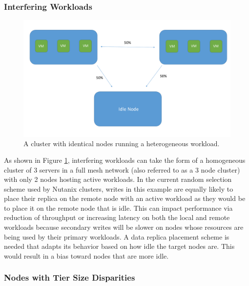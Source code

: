 \documentclass[12pt]{article}
\begin{document}
    \subsubsection{Interfering Workloads}

    \begin{figure}[htbp]
      \centering
      \includegraphics[scale=0.45]{images/homogeneous_workload_disparity.pdf} 
      \caption{A cluster with identical nodes running a heterogeneous workload.}
      \label{fig:workload_disparity}
    \end{figure}

    As shown in Figure \ref{fig:workload_disparity}, interfering workloads can
    take the form of a homogeneous cluster of 3 servers in a full mesh network
    (also referred to as a 3 node cluster) with only 2 nodes hosting active
    workloads. In the current random selection scheme used by Nutanix
    clusters, writes in this example are equally likely to place their replica
    on the remote node with an active workload as they would be to place it on
    the remote node that is idle.  This can impact performance via reduction of
    throughput or increasing latency on both the
    local and remote workloads because secondary writes will be slower on nodes
    whose resources are being used by their primary workloads. A data replica
    placement scheme is needed that adapts its behavior based on how idle
    the target nodes are. This would result in a bias toward nodes that are
    more idle.

    \subsubsection{Nodes with Tier Size Disparities}
\end{document}
